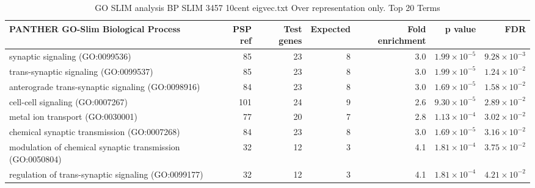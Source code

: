 \begin{table}[ht]
\centering
\begin{adjustbox}{width=\textwidth}
\begin{tabular}{lrrrrrr}
  \hline
PANTHER GO-Slim Biological Process & PSP ref & Test genes & Expected & Fold enrichment & p value & FDR \\ 
  \hline
synaptic signaling (GO:0099536) & 85 & 23 & 8 & 3.0 & $1.99 \times 10^{-5}$ & $9.28 \times 10^{-3}$ \\ 
  trans-synaptic signaling (GO:0099537) & 85 & 23 & 8 & 3.0 & $1.99 \times 10^{-5}$ & $1.24 \times 10^{-2}$ \\ 
  anterograde trans-synaptic signaling (GO:0098916) & 84 & 23 & 8 & 3.0 & $1.69 \times 10^{-5}$ & $1.58 \times 10^{-2}$ \\ 
  cell-cell signaling (GO:0007267) & 101 & 24 & 9 & 2.6 & $9.30 \times 10^{-5}$ & $2.89 \times 10^{-2}$ \\ 
  metal ion transport (GO:0030001) & 77 & 20 & 7 & 2.8 & $1.13 \times 10^{-4}$ & $3.02 \times 10^{-2}$ \\ 
  chemical synaptic transmission (GO:0007268) & 84 & 23 & 8 & 3.0 & $1.69 \times 10^{-5}$ & $3.16 \times 10^{-2}$ \\ 
  modulation of chemical synaptic transmission (GO:0050804) & 32 & 12 & 3 & 4.1 & $1.81 \times 10^{-4}$ & $3.75 \times 10^{-2}$ \\ 
  regulation of trans-synaptic signaling (GO:0099177) & 32 & 12 & 3 & 4.1 & $1.81 \times 10^{-4}$ & $4.21 \times 10^{-2}$ \\ 
   \hline
\end{tabular}
\end{adjustbox}
\caption{GO SLIM analysis BP SLIM 3457 10cent eigvec.txt Over representation only. Top 20 Terms} 
\label{tab:GO SLIM analysis BP SLIM 3457 10cent eigvec.txt Over representation only. Top 20 Terms}
\end{table}

